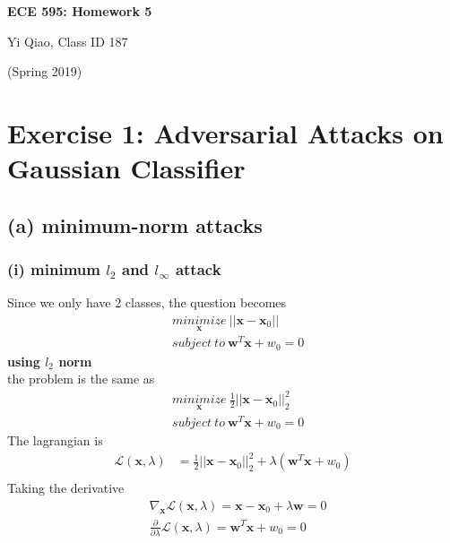 \documentclass[11pt]{article}
\begin{document}
\begin{center}
\Large{\textbf{ECE 595: Homework 5}}

Yi Qiao, Class ID 187

(Spring 2019)
\end{center}

\section*{Exercise 1: Adversarial Attacks on Gaussian Classifier}
\subsection*{(a) minimum-norm attacks}
\subsubsection*{(i) minimum $l_2$ and $l_\infty$ attack}
Since we only have 2 classes, the question becomes
\begin{equation}
\begin{split}
&\underset{\pmb{x}}{minimize}\ ||\pmb{x} - \pmb{x}_0||\\
&subject\ to\ \pmb{w}^T\pmb{x} + w_0 = 0
\end{split}
\end{equation}
\noindent\textbf{using $l_2$ norm}\\
the problem is the same as\\
\begin{equation}
\begin{split}
&\underset{\pmb{x}}{minimize}\ \frac{1}{2}||\pmb{x} - \pmb{x}_0||^2_2\\
&subject\ to\ \pmb{w}^T\pmb{x} + w_0 = 0
\end{split}
\end{equation}
The lagrangian is
\begin{equation}
\begin{split}
\mathcal{L}(\pmb{x},\lambda) &= \frac{1}{2}||\pmb{x}-\pmb{x}_0||^2_2 + \lambda(\pmb{w}^T\pmb{x} + w_0)\\
\end{split}
\end{equation}
Taking the derivative
\begin{equation}
\begin{split}
&\nabla_{\pmb{x}}\mathcal{L}(\pmb{x},\lambda) = \pmb{x} - \pmb{x}_0 + \lambda\pmb{w}=0\\
&\frac{\partial}{\partial\lambda}\mathcal{L}(\pmb{x},\lambda)=\pmb{w}^T\pmb{x} + w_0=0
\end{split}
\end{equation}
\end{document}
